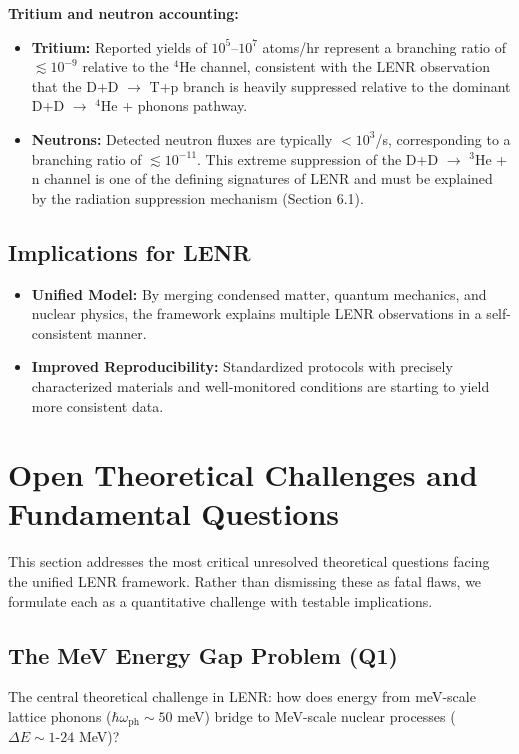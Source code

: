 \documentclass[11pt,a4paper]{article}
\begin{document}
\textbf{Tritium and neutron accounting:}

\begin{itemize}
\item
  \textbf{Tritium:} Reported yields of $10^5$--$10^7$ atoms/hr represent a branching ratio of $\lesssim 10^{-9}$ relative to the $^{4}$He channel, consistent with the LENR observation that the D+D $\rightarrow$ T+p branch is heavily suppressed relative to the dominant D+D $\rightarrow$ $^{4}$He + phonons pathway.
\item
  \textbf{Neutrons:} Detected neutron fluxes are typically $< 10^3$/s, corresponding to a branching ratio of $\lesssim 10^{-11}$. This extreme suppression of the D+D $\rightarrow$ $^{3}$He + n channel is one of the defining signatures of LENR and must be explained by the radiation suppression mechanism (Section 6.1).
\end{itemize}

\subsection{Implications for LENR}

\begin{itemize}
\item
  \textbf{Unified Model:} By merging condensed matter, quantum mechanics, and nuclear physics, the framework explains multiple LENR observations in a self-consistent manner.
\item
  \textbf{Improved Reproducibility:} Standardized protocols with precisely characterized materials and well-monitored conditions are starting to yield more consistent data.
\end{itemize}

\section{Open Theoretical Challenges and Fundamental Questions}

This section addresses the most critical unresolved theoretical questions facing the unified LENR framework. Rather than dismissing these as fatal flaws, we formulate each as a quantitative challenge with testable implications.

\subsection{The MeV Energy Gap Problem (Q1)}

The central theoretical challenge in LENR: how does energy from meV-scale lattice phonons ($\hbar\omega_{\text{ph}} \sim 50$ meV) bridge to MeV-scale nuclear processes ($\Delta E \sim 1\text{-}24$ MeV)?
\end{document}
